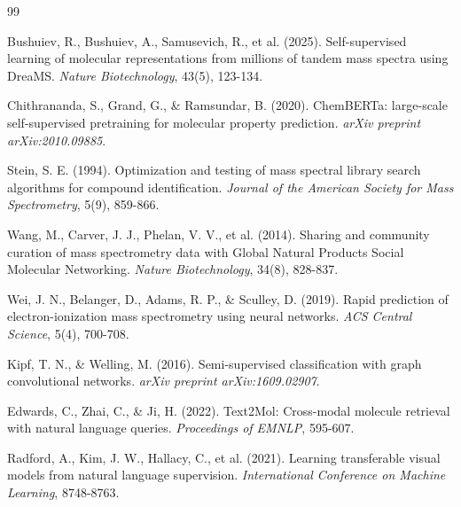 \documentclass[11pt]{article}
\begin{document}
\begin{thebibliography}{99}

Bushuiev, R., Bushuiev, A., Samusevich, R., et al. (2025).
Self-supervised learning of molecular representations from millions of tandem mass spectra using DreaMS.
\textit{Nature Biotechnology}, 43(5), 123-134.

Chithrananda, S., Grand, G., \& Ramsundar, B. (2020).
ChemBERTa: large-scale self-supervised pretraining for molecular property prediction.
\textit{arXiv preprint arXiv:2010.09885}.

Stein, S. E. (1994).
Optimization and testing of mass spectral library search algorithms for compound identification.
\textit{Journal of the American Society for Mass Spectrometry}, 5(9), 859-866.

Wang, M., Carver, J. J., Phelan, V. V., et al. (2014).
Sharing and community curation of mass spectrometry data with Global Natural Products Social Molecular Networking.
\textit{Nature Biotechnology}, 34(8), 828-837.

Wei, J. N., Belanger, D., Adams, R. P., \& Sculley, D. (2019).
Rapid prediction of electron-ionization mass spectrometry using neural networks.
\textit{ACS Central Science}, 5(4), 700-708.

Kipf, T. N., \& Welling, M. (2016).
Semi-supervised classification with graph convolutional networks.
\textit{arXiv preprint arXiv:1609.02907}.

Edwards, C., Zhai, C., \& Ji, H. (2022).
Text2Mol: Cross-modal molecule retrieval with natural language queries.
\textit{Proceedings of EMNLP}, 595-607.

Radford, A., Kim, J. W., Hallacy, C., et al. (2021).
Learning transferable visual models from natural language supervision.
\textit{International Conference on Machine Learning}, 8748-8763.

\end{thebibliography}
\end{document}
